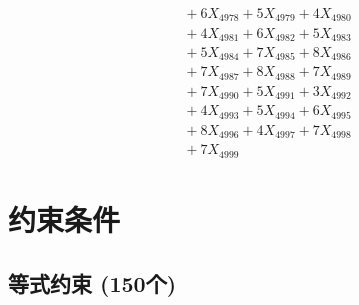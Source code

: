 \documentclass[a4paper,10pt]{article}
\begin{document}
{\begin{align}
&\;  + 6 X_{4978} + 5 X_{4979} + 4 X_{4980} \\[0.3ex]
&\;  + 4 X_{4981} + 6 X_{4982} + 5 X_{4983} \\[0.3ex]
&\;  + 5 X_{4984} + 7 X_{4985} + 8 X_{4986} \\[0.3ex]
&\;  + 7 X_{4987} + 8 X_{4988} + 7 X_{4989} \\[0.5ex]\allowbreak
&\;  + 7 X_{4990} + 5 X_{4991} + 3 X_{4992} \\[0.3ex]
&\;  + 4 X_{4993} + 5 X_{4994} + 6 X_{4995} \\[0.3ex]
&\;  + 8 X_{4996} + 4 X_{4997} + 7 X_{4998} \\[0.3ex]
&\;  + 7 X_{4999}\nonumber
\end{align}
}

\section{约束条件}

\subsection{等式约束 (150个)}
\end{document}
